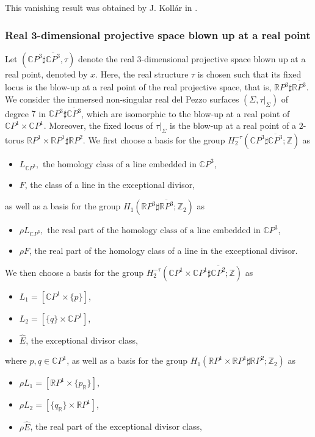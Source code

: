 \documentclass[11pt]{amsart}
\numberwithin{equation}{section}
\theoremstyle{definition}
\theoremstyle{plain}
\theoremstyle{remark}
\newcommand{\R}{\mathbb{R}}
\newcommand{\Z}{\mathbb{Z}}
\newcommand{\C}{\mathbb{C}}
\newcommand{\cpp}{\mathbb{C}P^3}
\newcommand{\pp}{\mathbb{C}P^1\times \mathbb{C}P^1}
\begin{document}
This vanishing result was obtained by J. Koll\'ar in \cite{kollar2015examples}.
\subsubsection{Real 3-dimensional projective space blown up at a real point}

Let $(\cpp\sharp\overline{\cpp},\tau)$ denote  the real $3$-dimensional projective space blown up at a real point, denoted by $x$. Here, the real structure $\tau$ is chosen such that its fixed locus is the blow-up at a real point of the real projective space, that is, $\R P^3\sharp{\overline{\R P^3}}$. We consider the immersed non-singular real del Pezzo surfaces $(\Sigma, \tau|_\Sigma)$ of degree $7$ in $\cpp\sharp\overline{\cpp}$,  which are isomorphic to the blow-up at a real point of $\pp$. Moreover, the fixed locus of $\tau|_\Sigma$ is the blow-up at a real point of a $2$-torus $\R P^1\times \R P^1 \sharp {\R P^2}$. We first choose a basis for the group $H_2^{-\tau }(\C P^3\sharp\overline{\C P^3};\Z)$ as
\begin{itemize}
    \item  $L_{\C P^3}, \text{ the homology class of a line embedded in } \C P^3$,
      \item $F$, the class of a line in the exceptional divisor,
\end{itemize}
as well as a basis for the group  $H_1(\R P^3  \sharp \overline{\R P^3};\Z_2)$ as
\begin{itemize}
       \item  $\rho L_{\C P^3},\text{ the real part of the homology class of a line embedded in } \C P^3$,
      \item $\rho F$, the real part of the homology class of a line in the exceptional divisor.
\end{itemize}
We then choose a basis for the group $H_2^{-\tau }(\pp\sharp\overline{\C P^2};\Z)$ as
\begin{itemize}
    \item  $L_1=[\C P^1\times \{p\}]$,
     \item $L_2=[\{q\}\times \C P^1]$,
      \item $\hat{E}$, the exceptional divisor class,
\end{itemize}
where $p,q \in \C P^1$, as well as a basis for the group  $H_1(\R P^1 \times \R P^1\sharp {\R P^2};\Z_2)$ as
\begin{itemize}
    \item  $\rho L_1=[\R P^1\times \{p_\R\}]$,
     \item $\rho L_2=[\{q_\R\}\times \R P^1]$,
      \item $\rho \hat{E}$, the real part of the exceptional divisor class,
\end{itemize}
\end{document}
